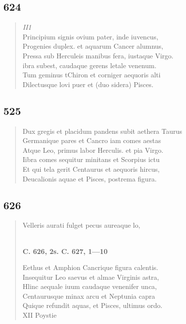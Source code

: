 \documentclass[11pt, a4paper]{report}
\begin{document}
            \subsection*{624}
      \begin{verse}
      \textit{II1} \\ Principium signis ovium pater, inde iuvencus, \\ Progenies duplex. et aquarum Cancer alumnus, \\ Pressa sub Herculeis manibus fera, iustaque Virgo. \\ ibra subest, caudaque gerens letale venenum. \\ Tum geminus tChiron et corniger aequoris alti \\ Dilectusque lovi puer et (duo sidera) Pisces. \\ 
      \end{verse}
  
            \subsection*{525}
      \begin{verse}
      Dux gregis et placidum pandens subit aethera Taurus \\ Germanique pares et Cancro iam comes aestas \\ Atque Leo, primus labor Herculis. et pia Virgo. \\ Iibra comes sequitur minitans et Scorpius ictu \\ Et qui tela gerit Centaurus et aequoris hircus, \\ Deucalionis aquae et Pisces, postrema figura. \\ 
      \end{verse}
  
            \subsection*{626}
      \begin{verse}
      Velleris aurati fulget pecus aureaque lo, \\ 
        ﻿\pagebreak 
    \begin{center} \textbf{C. 626, 2s. C. 627, 1—10} \end{center} \marginpar{[95]} Eethus et Amphion Cancrique figura calentis. \\ Insequitur Leo saevus et almae Virginis astra, \\ Hlinc aequale iuum caudaque venenifer unca, \\ Centaurusque minax arcu et Neptunia capra \\ Quique refundit aquas, et Pisces, ultimus ordo. \\ XII Poystie \rbrack  \\ 
      \end{verse}
  
\end{document}
